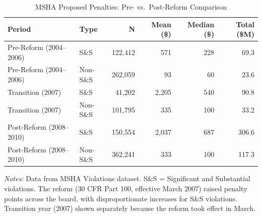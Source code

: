 \begin{table}[H]
\centering
\caption{MSHA Proposed Penalties: Pre- vs.\ Post-Reform Comparison}
\label{tab:penalties}
\footnotesize
\begin{tabular}{llrrrr}
\toprule
Period & Type & N & Mean (\$) & Median (\$) & Total (\$M) \\
\midrule
Pre-Reform (2004--2006) & S\&S & 122,412 & 571 & 228 & 69.3 \\
Pre-Reform (2004--2006) & Non-S\&S & 262,059 & 93 & 60 & 23.6 \\
Transition (2007) & S\&S & 41,202 & 2,205 & 540 & 90.8 \\
Transition (2007) & Non-S\&S & 101,795 & 335 & 100 & 33.2 \\
Post-Reform (2008--2010) & S\&S & 150,554 & 2,037 & 687 & 306.6 \\
Post-Reform (2008--2010) & Non-S\&S & 362,241 & 333 & 100 & 117.3 \\
\bottomrule
\end{tabular}
\par\vspace{0.3em}
{\scriptsize \textit{Notes:} Data from MSHA Violations dataset. S\&S = Significant and Substantial violations. The reform (30 CFR Part 100, effective March 2007) raised penalty points across the board, with disproportionate increases for S\&S violations. Transition year (2007) shown separately because the reform took effect in March.}
\end{table}

